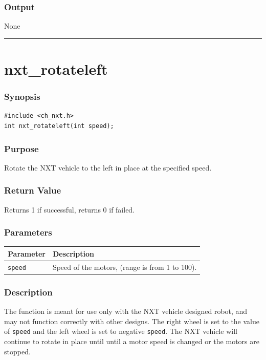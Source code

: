 \documentclass[12pt]{article}
\begin{document}
\subsubsection*{Output}
None 
\\

\hrule
\newpage

\section*{nxt\_rotateleft}

\subsubsection*{Synopsis}
\begin{verbatim}
#include <ch_nxt.h>
int nxt_rotateleft(int speed);
\end{verbatim}

\subsubsection*{Purpose}
Rotate the NXT vehicle to the left in place at the specified speed.

\subsubsection*{Return Value}
Returns 1 if successful, returns 0 if failed.

\subsubsection*{Parameters}
\begin{tabular}{ l | p{12cm} }
Parameter			& Description\\ \hline
\verb+speed+	    & Speed of the motors, (range is from 1 to 100).
\end{tabular}

\subsubsection*{Description}
The function is meant for use only with the NXT vehicle designed robot, 
and may not function correctly with other designs. The right wheel is 
set to the value of \verb+speed+ and the left wheel is set to 
negative \verb+speed+.  The NXT vehicle will continue to rotate in 
place until until a motor speed is changed or the motors are stopped.
\end{document}
